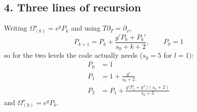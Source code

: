 \documentclass[11pt,a4paper]{article}
\begin{document}
\subsection*{4. Three lines of recursion}
Writing $\Omega^{\star}_{(k)} = e^{g} P_k$ and using $T\partial_T = \partial_x$,
\begin{equation}
  P_{k+1} = P_k + \frac{g' P_k + P_k'}{s_0+k+2},\qquad P_0 = 1
\end{equation}
so for the two levels the code actually needs ($s_0 = 5$ for $l=1$):
\begin{align}
  P_0 &= 1 \\
  P_1 &= 1 + \frac{g'}{s_0+2} \\
  P_2 &= P_1 + \frac{g' P_1 + g''/(s_0+2)}{s_0+3}
\end{align}
and $\Omega^{\star}_{(k)} = e^{g} P_k$.
\end{document}
